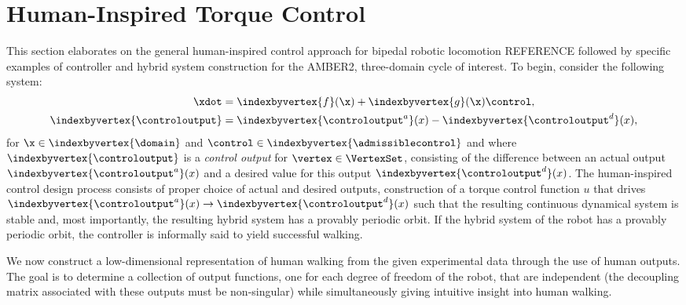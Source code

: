 \section{Human-Inspired Torque Control}
This section elaborates on the general human-inspired control approach for bipedal robotic locomotion REFERENCE followed by specific examples of controller and hybrid system construction for the AMBER2, three-domain cycle of interest.
To begin, consider the following system:
\begin{align}
\xdot &= \indexbyvertex{f}(\x) + \indexbyvertex{g} (\x) \control,\\
\indexbyvertex{\controloutput} &= \indexbyvertex{\controloutput^a}(x) - \indexbyvertex{\controloutput^d}(x),
\end{align}
for $\x \in \indexbyvertex{\domain}$ and $\control \in \indexbyvertex{\admissiblecontrol}$ and where $\indexbyvertex{\controloutput} $ is a \textit{control output} for $\vertex \in \VertexSet$, consisting of the difference between an actual output $\indexbyvertex{\controloutput^a}(x)$ and a desired value for this output $\indexbyvertex{\controloutput^d}(x)$. The human-inspired control design process consists of proper choice of actual and desired outputs, construction of a torque control function $u$ that drives $\indexbyvertex{\controloutput^a}(x) \to \indexbyvertex{\controloutput^d}(x)$ such that the resulting continuous dynamical system is stable and, most importantly, the resulting hybrid system has a provably periodic orbit. If the hybrid system of the robot has a provably periodic orbit, the controller is informally said to yield successful walking.



We now construct a low-dimensional representation of human walking from the given experimental data through the use of human outputs. The goal is to determine a collection of output functions, one for each degree of freedom of the robot, that are independent (the decoupling matrix associated with these outputs must be non-singular) while simultaneously giving intuitive insight into human walking.

